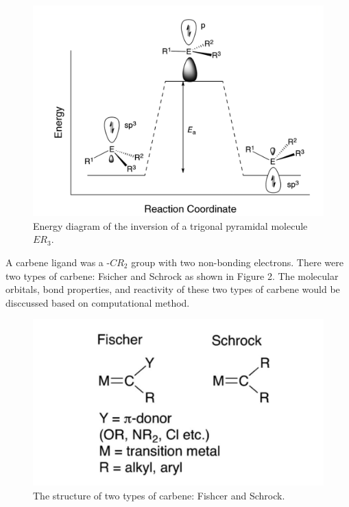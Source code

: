 \documentclass[twocolumn]{article} %
\begin{document}
\begin{figure}[h!]
      \centering
      \includegraphics[width=0.95\columnwidth]{inversion.png} %
      \vspace{2mm} %
      \caption{Energy diagram of the inversion of a trigonal pyramidal molecule $ER_3$.\cite{Part1}}
\end{figure}

A carbene ligand was a -$CR_2$ group with two non-bonding electrons. There were two types of carbene: Fsicher and Schrock as shown in Figure 2. The molecular orbitals, bond properties, and reactivity of these two types of carbene would be disccussed based on computational method. 
\begin{figure}[h!]
      \centering
      \includegraphics[width=0.95\columnwidth]{carbenenew.png} %
      \vspace{2mm} %
      \caption{The structure of two types of carbene: Fishcer and Schrock.\cite{Montgomery}}
\end{figure}
\end{document}
